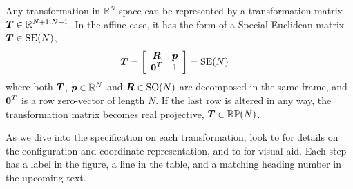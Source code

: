 Any transformation in $\mathbb{R}^N$-space can be represented by a transformation matrix $\boldsymbol{T} \in \mathbb{R}^{N+1,N+1}$. In the affine case, it has the form of a Special Euclidean matrix $\boldsymbol{T}\in\mathrm{SE}(N)$,
%
\begin{align}
\dvec{T} &= 
\left[\begin{array}{c c}
 \mat{R}  & \dvec{p} \\%
 \dvec{0}^T  &  1
\end{array}\right] = \mathrm{SE}(N)\label{eq_homogeneous_affine_transform}
\end{align}
%
where both $\boldsymbol{T}$, $\boldsymbol{p}\in\mathbb{R}^N$ and $\boldsymbol{R}\in\mathrm{SO}(N)$ are decomposed in the same frame, and $\boldsymbol{0}^T$ is a row zero-vector of length $N$. If the last row is altered in any way, the transformation matrix becomes real projective, $\boldsymbol{T}\in\mathbb{RP}(N)$. %

As we dive into the specification on each transformation, look to  for details on the configuration and coordinate representation, and to  for visual aid. Each step has a label in the figure, a line in the table, and a matching heading number in the upcoming text.



%


